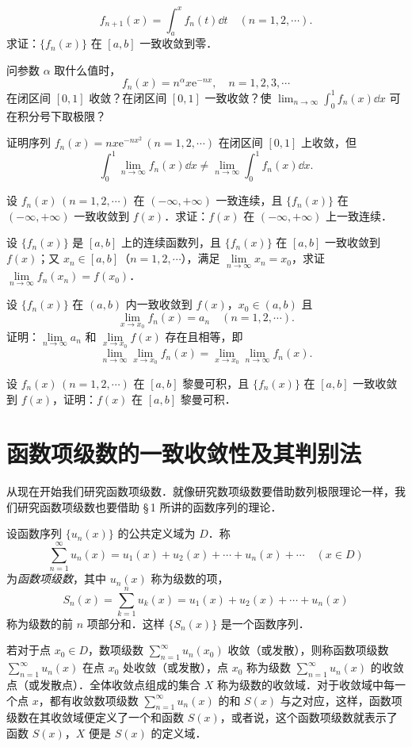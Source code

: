 \begin{xiti}
\[
f_{n+1}(x)=\int_{a}^{x}f_{n}(t)\dd t\quad(n=1,2,\cdots).
\]
求证：$\{f_{n}(x)\}$ 在 $[a,b]$ 一致收敛到零．
\item 问参数 $\alpha$ 取什么值时，
\[
f_{n}(x)=n^{\alpha}x\mathrm{e}^{-nx},\quad n=1,2,3,\cdots
\]
在闭区间 $[0,1]$ 收敛？在闭区间 $[0,1]$ 一致收敛？使 $\displaystyle\lim_{n\to\infty}\int_{0}^{1}f_{n}(x)\dd x$ 可在积分号下取极限？
\item 证明序列 $f_{n}(x)=nx\mathrm{e}^{-nx^{2}}\,(n=1,2,\cdots)$ 在闭区间 $[0,1]$ 上收敛，但
\[
\int_{0}^{1}\lim_{n\to\infty}f_{n}(x)\dd x\neq\lim_{n\to\infty}\int_{0}^{1}f_{n}(x)\dd x.
\]
\item 设 $f_{n}(x)\,(n=1,2,\cdots)$ 在 $(-\infty,+\infty)$ 一致连续，且 $\{f_{n}(x)\}$ 在 $(-\infty,+\infty)$ 一致收敛到 $f(x)$．求证：$f(x)$ 在 $(-\infty,+\infty)$ 上一致连续．
\item 设 $\{f_{n}(x)\}$ 是 $[a,b]$ 上的连续函数列，且 $\{f_{n}(x)\}$ 在 $[a,b]$ 一致收敛到 $f(x)$；又 $x_{n}\in[a,b]$（$n=1,2,\cdots$），满足 $\lim\limits_{n\to\infty}x_{n}=x_{0}$，求证 $\lim\limits_{n\to\infty}f_{n}(x_{n})=f(x_{0})$．
\item 设 $\{f_{n}(x)\}$ 在 $(a,b)$ 内一致收敛到 $f(x)$，$x_{0}\in(a,b)$ 且
\[
\lim_{x\to x_{0}}f_{n}(x)=a_{n}\quad(n=1,2,\cdots).
\]
证明：$\lim\limits_{n\to\infty}a_{n}$ 和 $\lim\limits_{x\to x_{0}}f(x)$ 存在且相等，即
\[
\lim_{n\to\infty}\lim_{x\to x_{0}}f_{n}(x)=\lim_{x\to x_{0}}\lim_{n\to\infty}f_{n}(x).
\]
\item 设 $f_{n}(x)\,(n=1,2,\cdots)$ 在 $[a,b]$ 黎曼可积，且 $\{f_{n}(x)\}$ 在 $[a,b]$ 一致收敛到 $f(x)$，证明：$f(x)$ 在 $[a,b]$ 黎曼可积．
\end{xiti}

\section{函数项级数的一致收敛性及其判别法}

从现在开始我们研究函数项级数．就像研究数项级数要借助数列极限理论一样，我们研究函数项级数也要借助 \S\,1 所讲的函数序列的理论．

设函数序列 $\{u_{n}(x)\}$ 的公共定义域为 $D$．称
\[
\sum_{n=1}^{\infty}u_{n}(x)=u_{1}(x)+u_{2}(x)+\cdots+u_{n}(x)+\cdots\quad(x\in D)
\]
为\emph{函数项级数}，其中 $u_{n}(x)$ 称为级数的项，
\[
S_{n}(x)=\sum_{k=1}^{n}u_{k}(x)=u_{1}(x)+u_{2}(x)+\cdots+u_{n}(x)
\]
称为级数的前 $n$ 项部分和．这样 $\{S_{n}(x)\}$ 是一个函数序列．

若对于点 $x_{0}\in D$，数项级数 $\displaystyle\sum_{n=1}^{\infty}u_{n}(x_{0})$ 收敛（或发散），则称函数项级数 $\displaystyle\sum_{n=1}^{\infty}u_{n}(x)$ 在点 $x_{0}$ 处收敛（或发散），点 $x_{0}$ 称为级数 $\displaystyle\sum_{n=1}^{\infty}u_{n}(x)$ 的收敛点（或发散点）．全体收敛点组成的集合 $X$ 称为级数的收敛域．对于收敛域中每一个点 $x$，都有收敛数项级数 $\displaystyle\sum_{n=1}^{\infty}u_{n}(x)$ 的和 $S(x)$ 与之对应，这样，函数项级数在其收敛域便定义了一个和函数 $S(x)$，或者说，这个函数项级数就表示了函数 $S(x)$，$X$ 便是 $S(x)$ 的定义域．

